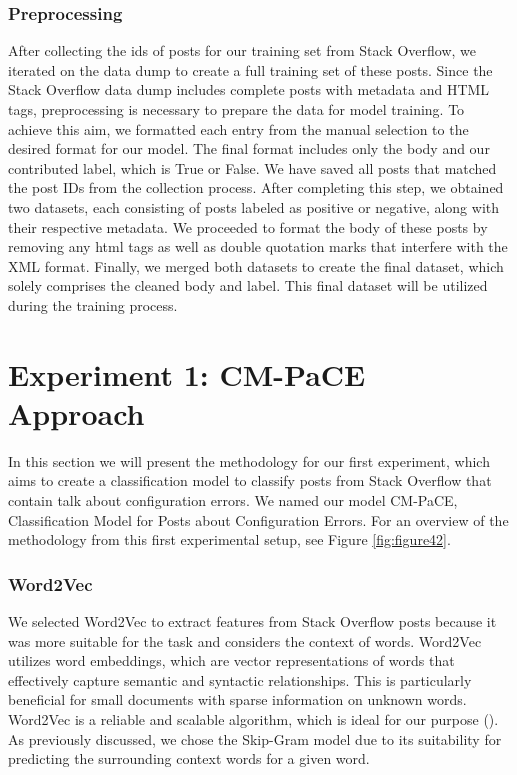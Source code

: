 \documentclass[english,bachelor]{swsLeipzig}
\begin{document}
\subsubsection{Preprocessing}
After collecting the ids of posts for our training set from Stack Overflow, we iterated on the data dump to create a 
full training set of these posts. Since the Stack Overflow data dump includes complete posts with metadata and HTML tags, preprocessing is necessary to prepare the data for model training. To achieve this aim, we formatted each entry from the manual selection to the desired format for our model. The final format includes only the body and our contributed label, which is True or False. We have saved all posts that matched the post IDs from the collection process. After completing this step, we obtained two datasets, each consisting of posts labeled as positive or negative, along with their respective metadata. We proceeded to format the body of these posts by removing any html tags as well as double quotation marks that interfere with the XML format. Finally, we merged both datasets to create the final dataset, which solely comprises the cleaned body and label. This final dataset will be utilized during the training process.

\section{Experiment 1: CM-PaCE Approach}

In this section we will present the methodology for our first experiment, which aims to create a classification model to classify posts from Stack Overflow that contain talk about configuration errors. We named our model CM-PaCE, Classification Model for Posts about Configuration Errors.
For an overview of the methodology from this first experimental setup, see Figure \ref{fig:figure42}. 

\subsubsection{Word2Vec}
We selected Word2Vec to extract features from Stack Overflow posts because it was more suitable for the task and 
considers the context of words. Word2Vec utilizes word embeddings, which are vector representations of words that effectively capture semantic and syntactic relationships. This is particularly beneficial for small documents with sparse information on unknown words. Word2Vec is a reliable and scalable algorithm, which is ideal for our purpose (\citet{mikolov:2013}). As previously discussed, we chose the Skip-Gram model due to its suitability for predicting the surrounding context words for a given word.
\end{document}
